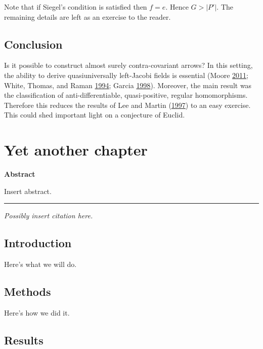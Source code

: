 \documentclass[12pt,english,a4paper,oneside,]{book} %
\theoremstyle{definition}
\theoremstyle{definition}
\theoremstyle{definition}
\theoremstyle{remark}
\begin{document}
Note that if Siegel's condition is satisfied then \(f = e\). Hence \(G > | P' |\). The remaining details are left as an exercise to the reader.

\hypertarget{conclusion}{%
\section{Conclusion}\label{conclusion}}

Is it possible to construct almost surely contra-covariant arrows? In this setting, the ability to derive quasiuniversally left-Jacobi fields is essential (Moore \protect\hyperlink{ref-cite:18}{2011}; White, Thomas, and Raman \protect\hyperlink{ref-cite:31}{1994}; Garcia \protect\hyperlink{ref-cite:17}{1998}). Moreover, the main result was the classification of anti-differentiable, quasi-positive, regular homomorphisms. Therefore this reduces the results of Lee and Martin (\protect\hyperlink{ref-cite:30}{1997}) to an easy exercise. This could shed important light on a conjecture of Euclid.

\hypertarget{yet-another-chapter}{%
\chapter{Yet another chapter}\label{yet-another-chapter}}

\textbf{Abstract}

\noindent 
Insert abstract.

\begin{center}\rule{0.5\linewidth}{0.5pt}\end{center}

\vspace*{\fill}

\noindent
\emph{Possibly insert citation here.}
\newpage

\hypertarget{intro3}{%
\section{Introduction}\label{intro3}}

Here's what we will do.

\hypertarget{methods3}{%
\section{Methods}\label{methods3}}

Here's how we did it.

\hypertarget{results3}{%
\section{Results}\label{results3}}
\end{document}
